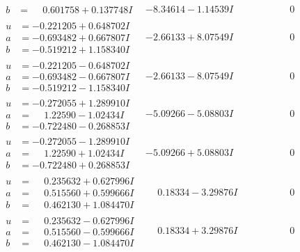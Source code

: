 \documentclass[1p]{elsarticle_modified}
\theoremstyle{definition}
\begin{document}
$$\begin{array}{c|c|c}
\begin{aligned}
b &= \phantom{-}0.601758 + 0.137748 I\end{aligned}
 & -8.34614 - 1.14539 I & \phantom{-0.000000 } 0 \\ \hline\begin{aligned}
u &= -0.221205 + 0.648702 I \\
a &= -0.693482 + 0.667807 I \\
b &= -0.519212 + 1.158340 I\end{aligned}
 & -2.66133 + 8.07549 I & \phantom{-0.000000 } 0 \\ \hline\begin{aligned}
u &= -0.221205 - 0.648702 I \\
a &= -0.693482 - 0.667807 I \\
b &= -0.519212 - 1.158340 I\end{aligned}
 & -2.66133 - 8.07549 I & \phantom{-0.000000 } 0 \\ \hline\begin{aligned}
u &= -0.272055 + 1.289910 I \\
a &= \phantom{-}1.22590 - 1.02434 I \\
b &= -0.722480 - 0.268853 I\end{aligned}
 & -5.09266 - 5.08803 I & \phantom{-0.000000 } 0 \\ \hline\begin{aligned}
u &= -0.272055 - 1.289910 I \\
a &= \phantom{-}1.22590 + 1.02434 I \\
b &= -0.722480 + 0.268853 I\end{aligned}
 & -5.09266 + 5.08803 I & \phantom{-0.000000 } 0 \\ \hline\begin{aligned}
u &= \phantom{-}0.235632 + 0.627996 I \\
a &= \phantom{-}0.515560 + 0.599666 I \\
b &= \phantom{-}0.462130 + 1.084470 I\end{aligned}
 & \phantom{-}0.18334 - 3.29876 I & \phantom{-0.000000 } 0 \\ \hline\begin{aligned}
u &= \phantom{-}0.235632 - 0.627996 I \\
a &= \phantom{-}0.515560 - 0.599666 I \\
b &= \phantom{-}0.462130 - 1.084470 I\end{aligned}
 & \phantom{-}0.18334 + 3.29876 I & \phantom{-0.000000 } 0 \\ \hline\begin{aligned}

\end{aligned}
\end{array}$$
\end{document}
